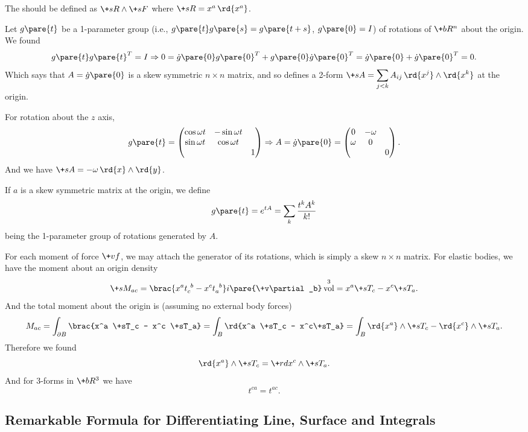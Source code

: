 \documentclass[hidelinks]{article}
\DeclareMathOperator{\vol}{vol}
\let\oldgloss\gloss
\def\gloss#1{\textbf{\oldgloss{#1}}}
\begin{document}
The  should be defined as $\+sR\wedge \+sF$ where $\+sR = x^a\,\rd{x^a}$.
\par
Let $g\pare{t}$ be a 1-parameter group (i.e., $g\pare{t}g\pare{s} = g\pare{t+s}$, $g\pare{0}  =I$) of rotations of $\+bR^n$ about the origin. We found
\[ g\pare{t}g\pare{t}^T = I \Rightarrow 0 = \dot{g}\pare{0} g\pare{0}^T + g\pare{0}\dot{g}\pare{0}^T = \dot{g}\pare{0} + \dot{g}\pare{0}^T = 0. \]
Which says that $A = \dot{g}\pare{0}$ is a skew symmetric $n\times n$ matrix, and so defines a 2-form $\displaystyle \+sA = \sum_{j<k} A_{ij}\,\rd{x^j}\wedge \rd{x^k}$ at the origin.
\begin{ex}
    For rotation about the $z$ axis,
    \[ g\pare{t} = \begin{pmatrix}
        \cos \omega t & -\sin\omega t & \\
        \sin \omega t & \cos \omega t & \\
        & & 1
    \end{pmatrix} \Rightarrow A = \dot{g}\pare{0} = \begin{pmatrix}
        0 & -\omega \\
        \omega & 0 \\
        & & 0
    \end{pmatrix}. \]
    And we have $\+sA = -\omega \,\rd{x}\wedge\rd{y}$.
\end{ex}
\par
If $a$ is a skew symmetric matrix at the origin, we define
\[ g\pare{t} = e^{tA} = \sum_k \frac{t^kA^k}{k!} \]
being the 1-parameter group of rotations generated by $A$.
\par
For each moment of force $\+vf$, we may attach the generator of its rotations, which is simply a skew $n\times n$ matrix. For elastic bodies, we have the moment about an origin density
\[ \+sM_{ac} = \brac{x^a \tensor{t}{_c^b} - x^c \tensor{t}{_a^b}}i\pare{\+v\partial_b}\vol^3 = x^a \+sT_c - x^c \+sT_a. \]
And the total moment about the origin is (assuming no external body forces)
\[ M_{ac} = \int_{\partial B} \brac{x^a \+sT_c - x^c \+sT_a} = \int_B \rd{x^a \+sT_c - x^c\+sT_a} = \int_B\rd{x^a}\wedge \+sT_c - \rd{x^c}\wedge \+sT_a. \]
Therefore we found
\[ \rd{x^a} \wedge \+sT_c = \+rd{x^c}\wedge \+sT_a. \]
And for 3-forms in $\+bR^3$ we have
\[ t^{ca} = t^{ac}. \]


\subsection{Remarkable Formula for Differentiating Line, Surface and Integrals} %
\label{sub:remarkable_formula_for_differentiating_line_surface_and_integrals}
\end{document}
